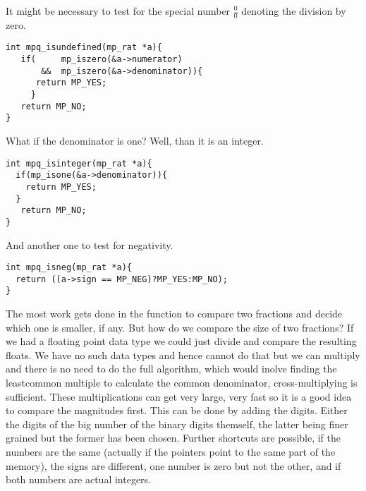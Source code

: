\documentclass[10pt]{book}
\theoremstyle{definition}
\theoremstyle{remark}
\begin{document}
It might be necessary to test for the special number  $\tfrac{0}{0}$ denoting
the division by zero.
 \begin{center}
    \begin{lstlisting}[caption={Test for a Division-By-Zero-Number},label=testdevzeronum]
int mpq_isundefined(mp_rat *a){
   if(     mp_iszero(&a->numerator)
       &&  mp_iszero(&a->denominator)){
      return MP_YES;
     }
   return MP_NO;
}
    \end{lstlisting}
  \end{center}
What if the denominator is one? Well, than it is an integer.
 \begin{center}
    \begin{lstlisting}[caption={Test for an Integer},label=testforint]
int mpq_isinteger(mp_rat *a){
  if(mp_isone(&a->denominator)){
    return MP_YES;
  }
   return MP_NO;
}
    \end{lstlisting}
  \end{center}
And another one to test for negativity.
 \begin{center}
    \begin{lstlisting}[caption={Test for Negativity},label=testforneg]
int mpq_isneg(mp_rat *a){
  return ((a->sign == MP_NEG)?MP_YES:MP_NO);
}
    \end{lstlisting}
  \end{center}
The most work gets done in the function to compare two fractions and decide
which one is smaller, if any. But how do we compare the size of two fractions?
If we had a floating point data type we could just divide and compare the
resulting floats. We have no such data types and hence cannot do that but we
can multiply and there is no need to do the full algorithm, which would inolve
finding the leastcommon multiple to calculate the common denominator,
cross-multiplying is sufficient. These multiplications can get very large, very
fast so it is a good idea to compare the magnitudes first.
This can be done by adding the digits. Either
the digits of the big number of the binary digits themself, the latter being
finer grained but the former has been chosen.
Further shortcuts are possible, if the numbers are the same (actually if the
pointers point to the same part of the memory), the signs are different, one
number is zero but not the other, and if both numbers are actual integers.
\end{document}
